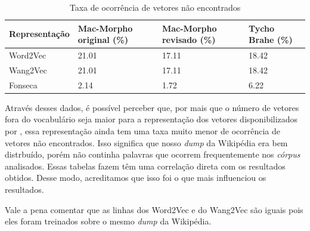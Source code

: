 



\begin{table}[!htb]
\footnotesize
\centering
\caption{Taxa de ocorrência de vetores não encontrados}
\label{tab:vetoresnaoencontradosocorrencia}
\begin{tabular}{lP{3cm}P{3cm}P{3cm}}
  \toprule
  \textbf{Representação} & \textbf{Mac-Morpho original (\%)}  & \textbf{Mac-Morpho revisado (\%)} & \textbf{Tycho Brahe (\%)} \\
  \midrule
  Word2Vec  & 21.01 & 17.11 & 18.42 \\
  Wang2Vec  & 21.01 & 17.11 & 18.42 \\
  Fonseca 	& 2.14  & 1.72  & 6.22 \\ 
  \bottomrule
\end{tabular}
\end{table}

Através desses dados, é possível perceber que, por mais que o número de vetores fora do vocabulário seja maior para a representação dos vetores disponibilizados por , essa representação ainda tem uma taxa muito menor de ocorrência de vetores não encontrados. Isso significa que nosso \textit{dump} da Wikipédia era bem distrbuído, porém não continha palavras que ocorrem frequentemente nos \textit{córpus} analisados. Essas tabelas fazem têm uma correlação direta com os resultados obtidos. Desse modo, acreditamos que isso foi o que mais influenciou os resultados.

Vale a pena comentar que as linhas dos Word2Vec e do Wang2Vec são iguais pois eles foram treinados sobre o mesmo \textit{dump} da Wikipédia.









